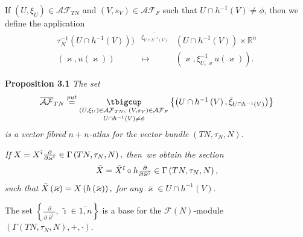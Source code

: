 \documentclass[11pt]{article}
\begin{document}
If $\left( U,\xi _{U}\right) \in \mathcal{AF}_{TN}$ and $\left(
V,s_{V}\right) \in \mathcal{AF}_{F}$ such that $U\cap h^{-1}\left( V\right)
\neq \phi $, then we define the application%
\begin{equation*}
\begin{array}{ccc}
\tau _{N}^{-1}(U{\cap }h^{-1}(V))) & {}^{\underrightarrow{\bar{\xi}_{U{\cap }%
h^{-1}(V)}}} & \left( U{\cap }h^{-1}(V)\right) {\times }\mathbb{R}^{n} \\
\left( \varkappa ,u\left( \varkappa \right) \right) & \longmapsto & \left(
\varkappa ,\xi _{U,\varkappa }^{-1}u\left( \varkappa \right) \right) .%
\end{array}%
\end{equation*}

\textbf{Proposition 3.1 }\emph{The set}%
\begin{equation*}
\begin{array}{c}
\overline{\mathcal{AF}}_{TN}\overset{put}{=}\underset{U\cap h^{-1}\left(
V\right) \neq \phi }{\underset{\left( U,\xi _{U}\right) \in \mathcal{AF}%
_{TN},~\left( V,s_{V}\right) \in \mathcal{AF}_{F}}{\tbigcup }}\left\{ \left(
U\cap h^{-1}\left( V\right) ,\bar{\xi}_{U{\cap }h^{-1}(V)}\right) \right\}%
\end{array}%
\end{equation*}%
\emph{is a vector fibred }$n+n$\emph{-atlas for the vector bundle }$\left(
TN,\tau _{N},N\right) .$

\emph{If }$X=X^{\tilde{\imath}}\frac{\partial }{\partial \varkappa ^{\tilde{%
\imath}}}\in \Gamma \left( TN,\tau _{N},N\right) ,$ \emph{then\ we obtain
the section }%
\begin{equation*}
\begin{array}{c}
\bar{X}=\bar{X}^{\tilde{\imath}}\circ h\frac{\partial }{\partial \bar{%
\varkappa}^{\tilde{\imath}}}\in \Gamma \left( TN,\tau _{N},N\right) ,%
\end{array}%
\end{equation*}%
\emph{such that }$\bar{X}\left( \bar{\varkappa}\right) =X\left( h\left( \bar{%
\varkappa}\right) \right) ,$ \emph{for any }$\bar{\varkappa}\in U\cap
h^{-1}\left( V\right) .$

The set $\left\{ \frac{\partial }{\partial \bar{\varkappa}^{\tilde{\imath}}}%
,~\tilde{\imath}\in \overline{1,n}\right\} $ is a base for the $\mathcal{F}%
\left( N\right) $-module $\left( \Gamma \left( TN,\tau _{N},N\right)
,+,\cdot \right) .$
\end{document}
